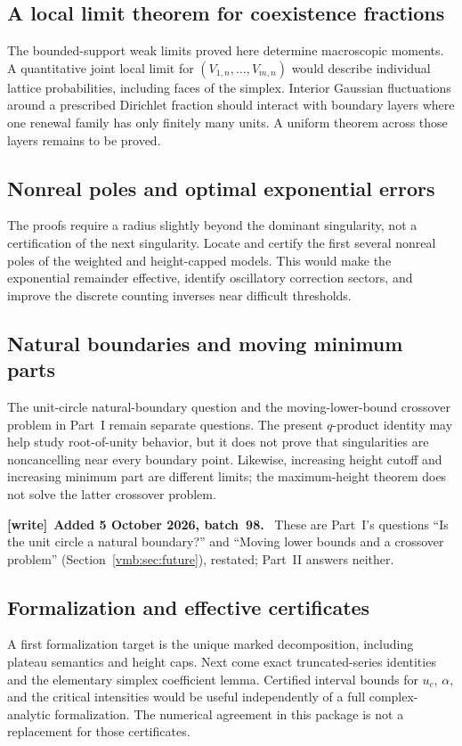 \documentclass[11pt,a4paper]{article}
\numberwithin{equation}{section}
\theoremstyle{definition}\newtheorem{definition}[theorem]{Definition}
\theoremstyle{remark}\newtheorem{remark}[theorem]{Remark}
\newenvironment{writenote}[1][]{\par\smallskip\begingroup\small
 \noindent\textbf{[write]}\if\relax\detokenize{#1}\relax\else~\textbf{#1.}\fi\ }%
 {\par\endgroup\smallskip}
\begin{document}
\subsection{A local limit theorem for coexistence fractions}
The bounded-support weak limits proved here determine macroscopic moments.
A quantitative joint local limit for $(V_{1,n},\ldots,V_{m,n})$ would describe
individual lattice probabilities, including faces of the simplex. Interior
Gaussian fluctuations around a prescribed Dirichlet fraction should interact
with boundary layers where one renewal family has only finitely many units.
A uniform theorem across those layers remains to be proved.

\subsection{Nonreal poles and optimal exponential errors}
The proofs require a radius slightly beyond the dominant singularity, not a
certification of the next singularity. Locate and certify the first several
nonreal poles of the weighted and height-capped models. This would make the
exponential remainder effective, identify oscillatory correction sectors,
and improve the discrete counting inverses near difficult thresholds.

\subsection{Natural boundaries and moving minimum parts}
The unit-circle natural-boundary question and the moving-lower-bound crossover
problem in Part~I remain separate questions. The present $q$-product
identity may help study root-of-unity behavior, but it does not prove that
singularities are noncancelling near every boundary point. Likewise, increasing
height cutoff and increasing minimum part are different limits; the
maximum-height theorem does not solve the latter crossover problem.

\begin{writenote}[Added 5 October 2026, batch~98]
These are Part~I's questions ``Is the unit circle a natural boundary?'' and
``Moving lower bounds and a crossover problem'' (Section~\ref{vmb:sec:future}),
restated; Part~II answers neither.
\end{writenote}

\subsection{Formalization and effective certificates}
\label{vmb:cw:sec:q-formal}
A first formalization target is the unique marked decomposition, including
plateau semantics and height caps. Next come exact truncated-series identities
and the elementary simplex coefficient lemma. Certified interval bounds for
$u_c$, $\alpha$, and the critical intensities would be useful independently
of a full complex-analytic formalization. The numerical agreement in this
package is not a replacement for those certificates.
\end{document}
